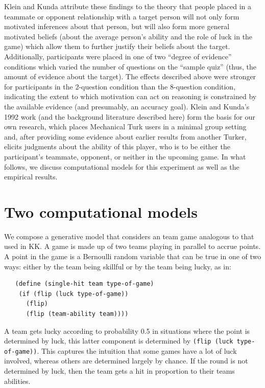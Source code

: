 \documentclass{article}
\begin{document}
Klein and Kunda attribute these findings to the theory that people placed in a teammate or opponent relationship with a target person will not only form motivated inferences about that person, but will also form more general motivated beliefs (about the average person's ability and the role of luck in the game) which allow them to further justify their beliefs about the target. Additionally, participants were placed in one of two ``degree of evidence'' conditions which varied the number of questions on the ``sample quiz'' (thus, the amount of evidence about the target). The effects described above were stronger for participants in the 2-question condition than the 8-question condition, indicating the extent to which motivation can act on reasoning is constrained by the available evidence (and presumably, an accuracy goal). Klein and Kunda's 1992 work (and the background literature described here) form the basis for our own research, which places Mechanical Turk users in a minimal group setting and, after providing some evidence about earlier results from another Turker, elicits judgments about the ability of this player, who is to be either the participant's teammate, opponent, or neither in the upcoming game. In what follows, we discuss computational models for this experiment as well as the empirical results.

\section{Two computational models}

We compose a generative model that considers an team game analogous to that used in KK. A game is made up of two teams playing in parallel to accrue points. A point in the game is a Bernoulli random variable that can be true in one of two ways: either by the team being skillful or by the team being lucky, as in:

\begin{lstlisting}
   (define (single-hit team type-of-game)
    (if (flip (luck type-of-game)) 
      (flip) 
      (flip (team-ability team))))
\end{lstlisting}

A team gets lucky according to probability 0.5 in situations where the point is determined by luck, this latter component is determined by \lstinline{(flip (luck type-of-game))}. This captures the intuition that some games have a lot of luck involved, whereas others are determined largely by chance. If the round is not determined by luck, then the team gets a hit in proportion to their teams abilities. 
\end{document}
